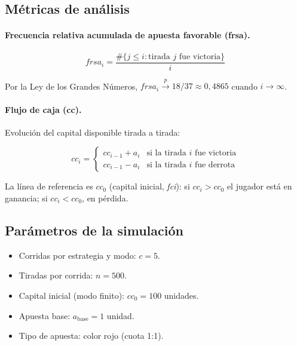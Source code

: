 \documentclass[a4paper, 11pt]{article}
\begin{document}
\subsection{Métricas de análisis}

\paragraph{Frecuencia relativa acumulada de apuesta favorable (frsa).}

\begin{equation}
  frsa_i = \frac{\#\{j \leq i : \text{tirada } j \text{ fue victoria}\}}{i}
  \label{eq:frsa}
\end{equation}

Por la Ley de los Grandes Números, $frsa_i \xrightarrow{p} 18/37 \approx 0{,}4865$
cuando $i \to \infty$.

\paragraph{Flujo de caja (cc).}

Evolución del capital disponible tirada a tirada:

\begin{equation}
  cc_i =
  \begin{cases}
    cc_{i-1} + a_i & \text{si la tirada } i \text{ fue victoria} \\
    cc_{i-1} - a_i & \text{si la tirada } i \text{ fue derrota}
  \end{cases}
  \label{eq:flujo_caja}
\end{equation}

La línea de referencia es $cc_0$ (capital inicial, \textit{fci}): si
$cc_i > cc_0$ el jugador está en ganancia; si $cc_i < cc_0$, en pérdida.

\subsection{Parámetros de la simulación}

\begin{itemize}
  \item Corridas por estrategia y modo: $c = 5$.
  \item Tiradas por corrida: $n = 500$.
  \item Capital inicial (modo finito): $cc_0 = 100$ unidades.
  \item Apuesta base: $a_{\text{base}} = 1$ unidad.
  \item Tipo de apuesta: color rojo (cuota 1:1).
\end{itemize}
\end{document}

